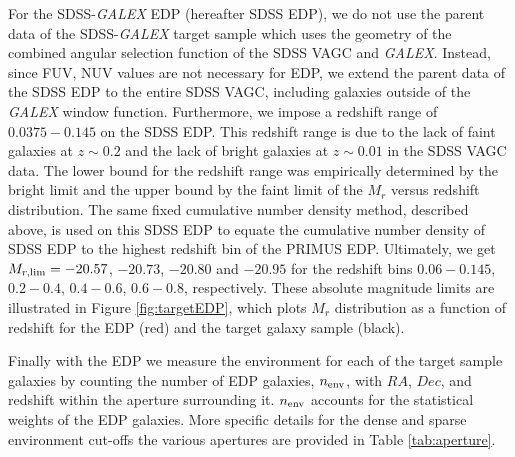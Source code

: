 \documentclass{emulateapj}
\begin{document}
For the SDSS-{\em GALEX} EDP (hereafter SDSS EDP), we do not use the parent data of 
the SDSS-{\em GALEX} target sample which uses the geometry of the combined angular selection function of the 
SDSS VAGC and {\em GALEX}. 
Instead, since FUV, NUV values are not necessary for EDP, we extend the parent data of the SDSS EDP
to the entire SDSS VAGC, including galaxies outside of the {\em GALEX} window function. 
Furthermore, we impose a redshift range of $0.0375-0.145$ on the SDSS EDP. 
This redshift range is due to the lack of faint galaxies at $z \sim 0.2$ and the lack of bright galaxies at 
$z \sim 0.01$ in the SDSS VAGC data.  
The lower bound for the redshift range was empirically determined by the bright limit and the upper bound 
by the faint limit of the $M_{r}$ versus redshift distribution. 
The same fixed cumulative number density method, described above, is used on this SDSS EDP to equate
the cumulative number density of SDSS EDP to the highest redshift bin of the PRIMUS EDP. 
Ultimately, we get $M_{r,\rm{lim}} = -20.57$, $-20.73$, $-20.80$ and $-20.95$ for the redshift bins $0.06-0.145$, 
$0.2-0.4$, $0.4-0.6$, $0.6-0.8$, respectively.  %
These absolute magnitude limits are illustrated in Figure \ref{fig:targetEDP}, which plots $M_{r}$ distribution as 
a function of redshift for the EDP (red) and the target galaxy sample (black). 

Finally with the EDP we measure the environment for each of the target sample galaxies by counting the number
of EDP galaxies, $n_{\rm{env}}$, with $RA$, $Dec$, and redshift within the aperture surrounding it. 
$n_{\rm{env}}$ accounts for the statistical weights of the EDP galaxies. 
More specific details for the dense and sparse environment cut-offs the various apertures are provided in Table \ref{tab:aperture}.
\end{document}

